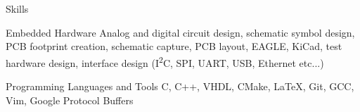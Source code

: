 

\section{\faToolbox}{Skills}

 \resumeEntryStart
  \resumeEntryS
	{Embedded Hardware}
	{
     Analog and digital circuit design, schematic symbol design, PCB footprint
     creation, schematic capture, PCB layout, EAGLE, KiCad, test hardware
     design, interface design (I\textsuperscript{2}C, SPI, UART, USB, Ethernet
     etc...)
	}

  \resumeEntryS
	{Programming Languages and Tools}
	{
     C, C++, VHDL, CMake, \LaTeX, Git, GCC, Vim, Google Protocol Buffers
	}

  \vspace{5pt}
 \resumeEntryEnd
